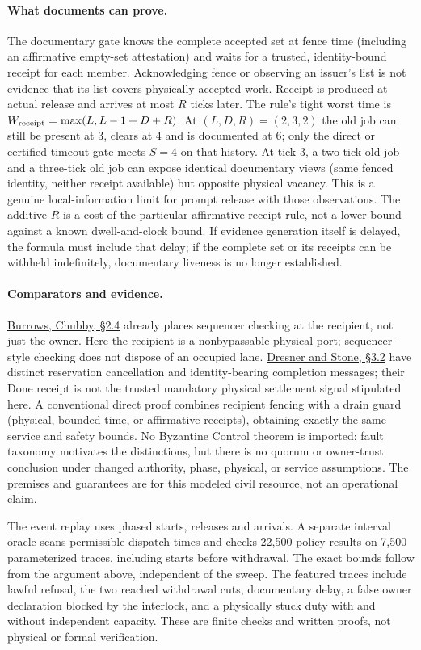 \documentclass[11pt]{article}
\begin{document}
\paragraph{What documents can prove.}
The documentary gate knows the complete accepted set at fence time (including an affirmative empty-set attestation) and waits for a trusted, identity-bound receipt for each member. Acknowledging fence or observing an issuer's list is not evidence that its list covers physically accepted work. Receipt is produced at actual release and arrives at most $R$ ticks later. The rule's tight worst time is $W_{\rm receipt}=\max(L,L-1+D+R)$. At $(L,D,R)=(2,3,2)$ the old job can still be present at 3, clears at 4 and is documented at 6; only the direct or certified-timeout gate meets $S=4$ on that history. At tick 3, a two-tick old job and a three-tick old job can expose identical documentary views (same fenced identity, neither receipt available) but opposite physical vacancy. This is a genuine local-information limit for prompt release with those observations. The additive $R$ is a cost of the particular affirmative-receipt rule, not a lower bound against a known dwell-and-clock bound. If evidence generation itself is delayed, the formula must include that delay; if the complete set or its receipts can be withheld indefinitely, documentary liveness is no longer established.

\paragraph{Comparators and evidence.}
\href{https://static.usenix.org/events/osdi06/tech/full_papers/burrows/burrows_html/}{Burrows, Chubby, \S2.4} already places sequencer checking at the recipient, not just the owner. Here the recipient is a nonbypassable physical port; sequencer-style checking does not dispose of an occupied lane. \href{https://www.cs.utexas.edu/~aim/papers/JAIR08-dresner.pdf}{Dresner and Stone, \S3.2} have distinct reservation cancellation and identity-bearing completion messages; their Done receipt is not the trusted mandatory physical settlement signal stipulated here. A conventional direct proof combines recipient fencing with a drain guard (physical, bounded time, or affirmative receipts), obtaining exactly the same service and safety bounds. No Byzantine Control theorem is imported: fault taxonomy motivates the distinctions, but there is no quorum or owner-trust conclusion under changed authority, phase, physical, or service assumptions. The premises and guarantees are for this modeled civil resource, not an operational claim.

The event replay uses phased starts, releases and arrivals. A separate interval oracle scans permissible dispatch times and checks 22,500 policy results on 7,500 parameterized traces, including starts before withdrawal. The exact bounds follow from the argument above, independent of the sweep. The featured traces include lawful refusal, the two reached withdrawal cuts, documentary delay, a false owner declaration blocked by the interlock, and a physically stuck duty with and without independent capacity. These are finite checks and written proofs, not physical or formal verification.
\end{document}
